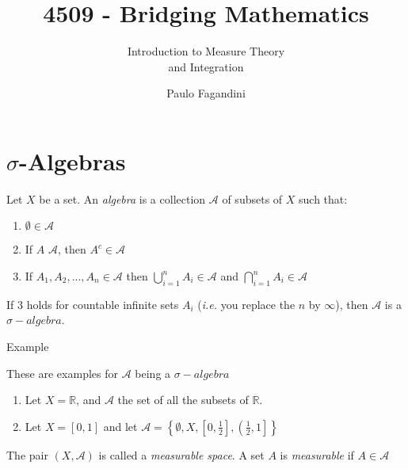 \documentclass[aspectratio=169,handout]{beamer}
\title[]{4509 - Bridging Mathematics}
\subtitle{Introduction to Measure Theory\\ and Integration}
\author[P. Fagandini]{Paulo Fagandini}
\institute{}
\date{}
\begin{document}
\section{$\sigma$-Algebras}

\begin{frame}
   \begin{definition}
        Let $X$ be a set. An \textit{algebra} is a collection $\mathcal{A}$ of subsets of $X$ such that:
        \begin{enumerate}
            \item $\emptyset \in \mathcal{A}$
            \item If $A$ \in $\mathcal{A}$, then $A^c\in\mathcal{A}$
            \item If $A_1,A_2,...,A_n\in\mathcal{A}$ then $\bigcup_{i=1}^n A_i\in\mathcal{A}$ and $\bigcap_{i=1}^n A_i\in\mathcal{A}$
        \end{enumerate}
        If 3 holds for countable infinite sets $A_i$ (\textit{i.e.} you replace the $n$ by $\infty$), then $\mathcal{A}$ is a $\sigma-algebra$.
   \end{definition}
\end{frame}

\begin{frame}{Example}

    These are examples for $\mathcal{A}$ being a $\sigma-algebra$

    \begin{enumerate}
        \item<1-> Let $X=\mathds{R}$, and $\mathcal{A}$ the set of all the subsets of $\mathds{R}$.
        \item<2-> Let $X=[0,1]$ and let $\mathcal{A}=\left\{\emptyset, X, \left[0,\frac{1}{2}\right], \left(\frac{1}{2},1\right]\right\}$
    \end{enumerate}
\end{frame}

\begin{frame}
    \begin{definition}
        The pair $(X,\mathcal{A})$ is called a \textit{measurable space}. A set $A$ is \textit{measurable} if $A\in\mathcal{A}$    
    \end{definition}
\end{frame}
\end{document}
